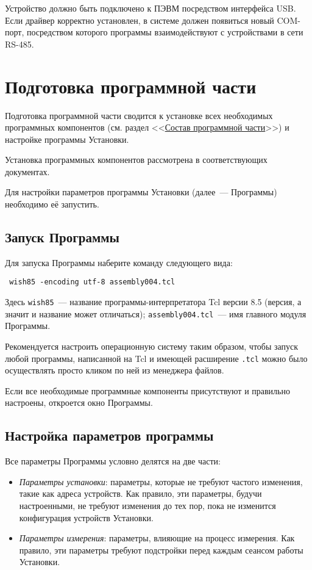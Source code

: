 \documentclass[12pt, a4paper, twocolumn]{report}
\begin{document}
Устройство должно быть подключено к ПЭВМ посредством интерфейса USB. Если драйвер корректно установлен, в системе должен появиться новый COM-порт, посредством которого программы взаимодействуют с устройствами в сети RS-485.

\section{Подготовка программной части}

Подготовка программной части сводится к установке всех необходимых программных компонентов (см. раздел <<\hyperref[sec_software]{Состав программной части}>>) и настройке программы Установки.

Установка программных компонентов рассмотрена в соответствующих документах.

Для настройки параметров программы Установки (далее~--- Программы) необходимо её запустить.

\subsection{Запуск Программы}

Для запуска Программы наберите команду следующего вида:

{\small
\begin{verbatim}
 wish85 -encoding utf-8 assembly004.tcl
\end{verbatim}
}

Здесь {\tt wish85}~--- название программы-интерпретатора Tcl версии 8.5 (версия, а значит и название может отличаться); {\tt assembly004.tcl}~--- имя главного модуля Программы.

Рекомендуется настроить операционную систему таким образом, чтобы запуск любой программы, написанной на Tcl и имеющей расширение {\tt .tcl} можно было осуществлять просто кликом по ней из менеджера файлов.

Если все необходимые программные компоненты присутствуют и правильно настроены, откроется окно Программы.

\subsection{Настройка параметров программы}

Все параметры Программы условно делятся на две части:

\begin{itemize}

\item \emph{Параметры установки}: параметры, которые не требуют частого изменения, такие как адреса устройств. Как правило, эти параметры, будучи настроенными, не требуют изменения до тех пор, пока не изменится конфигурация устройств Установки.

\item \emph{Параметры измерения}: параметры, влияющие на процесс измерения. Как правило, эти параметры требуют подстройки перед каждым сеансом работы Установки.

\end{itemize}
\end{document}
